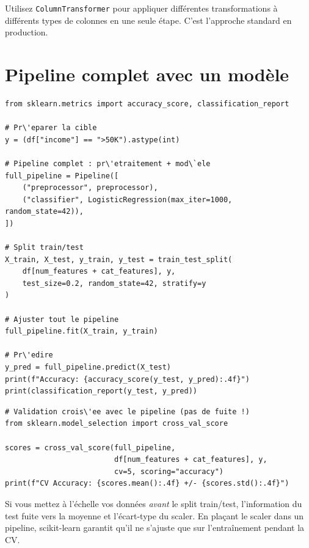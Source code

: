 \begin{preprocesstip}
Utilisez \texttt{ColumnTransformer} pour appliquer diff\'erentes transformations \`a diff\'erents types de colonnes en une seule \'etape. C'est l'approche standard en production.
\end{preprocesstip}

\section{Pipeline complet avec un mod\`ele}

\begin{verbatim}
from sklearn.metrics import accuracy_score, classification_report

# Pr\'eparer la cible
y = (df["income"] == ">50K").astype(int)

# Pipeline complet : pr\'etraitement + mod\`ele
full_pipeline = Pipeline([
    ("preprocessor", preprocessor),
    ("classifier", LogisticRegression(max_iter=1000, random_state=42)),
])

# Split train/test
X_train, X_test, y_train, y_test = train_test_split(
    df[num_features + cat_features], y,
    test_size=0.2, random_state=42, stratify=y
)

# Ajuster tout le pipeline
full_pipeline.fit(X_train, y_train)

# Pr\'edire
y_pred = full_pipeline.predict(X_test)
print(f"Accuracy: {accuracy_score(y_test, y_pred):.4f}")
print(classification_report(y_test, y_pred))
\end{verbatim}

\begin{verbatim}
# Validation crois\'ee avec le pipeline (pas de fuite !)
from sklearn.model_selection import cross_val_score

scores = cross_val_score(full_pipeline,
                         df[num_features + cat_features], y,
                         cv=5, scoring="accuracy")
print(f"CV Accuracy: {scores.mean():.4f} +/- {scores.std():.4f}")
\end{verbatim}

\begin{warningbox}
Si vous mettez \`a l'\'echelle vos donn\'ees \emph{avant} le split train/test, l'information du test fuite vers la moyenne et l'\'ecart-type du scaler. En pla\c{c}ant le scaler dans un pipeline, scikit-learn garantit qu'il ne s'ajuste que sur l'entra\^inement pendant la CV.
\end{warningbox}

